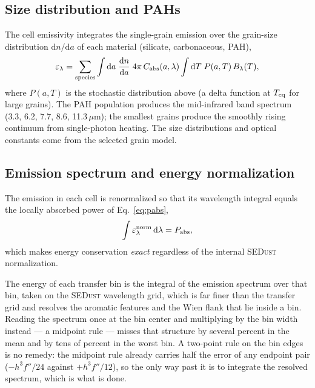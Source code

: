 \documentclass[english,a4paper]{kiseon_memo}
\newcommand{\Cabs}{C_{\mathrm{abs}}}
\newcommand{\dd}{\mathrm{d}}
\begin{document}
\subsection{Size distribution and PAHs}
The cell emissivity integrates the single-grain emission over the grain-size
distribution $\dd n/\dd a$ of each material (silicate, carbonaceous, PAH),
\begin{equation}
  \varepsilon_\lambda = \sum_{\rm species}\int \dd a\;\frac{\dd n}{\dd a}\;
     4\pi\,\Cabs(a,\lambda)\int \dd T\; P(a,T)\, B_\lambda(T),
  \label{eq:emis}
\end{equation}
where $P(a,T)$ is the stochastic distribution above (a delta function at
$T_{\rm eq}$ for large grains).  The PAH population produces the mid-infrared
band spectrum (3.3, 6.2, 7.7, 8.6, 11.3\,$\mu$m); the smallest grains produce
the smoothly rising continuum from single-photon heating.  The size
distributions and optical constants come from the selected grain model.

\subsection{Emission spectrum and energy normalization}
The emission in each cell is renormalized so that its wavelength integral equals
the locally absorbed power of Eq.~\eqref{eq:pabs},
\begin{equation}
  \int \varepsilon_\lambda^{\rm norm}\,\dd\lambda = P_{\rm abs},
\end{equation}
which makes energy conservation \emph{exact} regardless of the internal
\textsc{SEDust} normalization.

The energy of each transfer bin is the integral of the emission spectrum over
that bin, taken on the \textsc{SEDust} wavelength grid, which is far finer than
the transfer grid and resolves the aromatic features and the Wien flank that lie
inside a bin.  Reading the spectrum once at the bin center and multiplying by
the bin width instead --- a midpoint rule --- misses that structure by several
percent in the mean and by tens of percent in the worst bin.  A two-point rule
on the bin edges is no remedy: the midpoint rule already carries half the error
of any endpoint pair ($-h^3f''/24$ against $+h^3f''/12$), so the only way past
it is to integrate the resolved spectrum, which is what is done.
\end{document}
